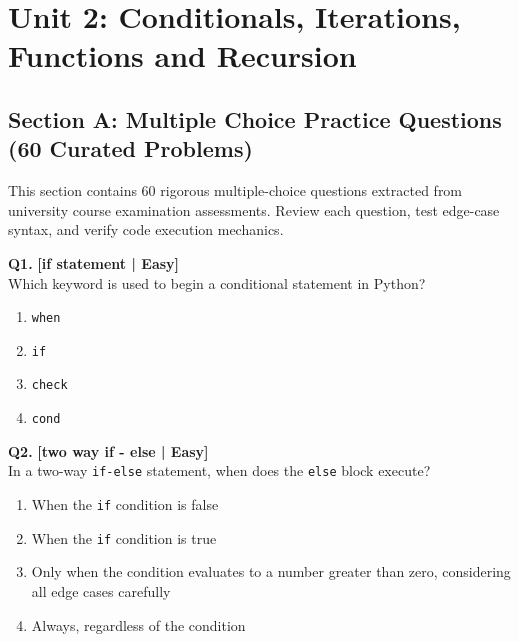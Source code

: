 \chapter{Unit 2: Conditionals, Iterations, Functions and Recursion}

\section{Section A: Multiple Choice Practice Questions (60 Curated Problems)}

\noindent This section contains 60 rigorous multiple-choice questions extracted from university course examination assessments. Review each question, test edge-case syntax, and verify code execution mechanics.
\vspace{3mm}

\noindent\textbf{Q1.} \hfill {\small\color{LPUOrange}\textbf{[if statement | Easy]}}\\[2pt]
Which keyword is used to begin a conditional statement in Python?

\begin{enumerate}[label=(\alph*),topsep=2pt,itemsep=1pt,partopsep=0pt,parsep=0pt]
    \item \relax \texttt{when}
    \item \relax \texttt{if}
    \item \relax \texttt{check}
    \item \relax \texttt{cond}
\end{enumerate}
\vspace{2mm}

\noindent\textbf{Q2.} \hfill {\small\color{LPUOrange}\textbf{[two way if - else | Easy]}}\\[2pt]
In a two-way \texttt{if-else} statement, when does the \texttt{else} block execute?

\begin{enumerate}[label=(\alph*),topsep=2pt,itemsep=1pt,partopsep=0pt,parsep=0pt]
    \item \relax When the \texttt{if} condition is false
    \item \relax When the \texttt{if} condition is true
    \item \relax Only when the condition evaluates to a number greater than zero, considering all edge cases carefully
    \item \relax Always, regardless of the condition
\end{enumerate}
\vspace{2mm}

